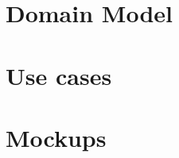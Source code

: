 \documentclass[a4paper, 12pt]{report}
\begin{document}


\part{Domain Model}



\part{Use cases}



\part{Mockups}


\end{document}
